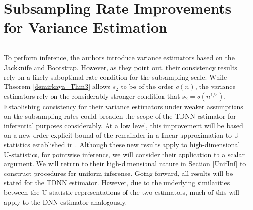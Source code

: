 \documentclass[letterpaper,10pt]{article}
\numberwithin{equation}{section}
\numberwithin{thm}{section}
\newcommand{\1}{\mathbb{1}}
\begin{document}
\section{Subsampling Rate Improvements for Variance Estimation}\label{Subsampling_Improvements}
\hrule
To perform inference, the authors introduce variance estimators based on the Jackknife and Bootstrap.
However, as they point out, their consistency results rely on a likely suboptimal rate condition for the subsampling scale.
While Theorem \ref{demirkaya_Thm3} allows $s_2$ to be of the order $o(n)$, the variance estimators rely on the considerably stronger condition that $s_2 = o(n^{1/3})$.
Establishing consistency for their variance estimators under weaker assumptions on the subsampling rates could broaden the scope of the TDNN estimator for inferential purposes considerably.
At a low level, this improvement will be based on a new order-explicit bound of the remainder in a linear approximation to U-statistics established in \citet{ritzwoller_uniform_2024}.
Although these new results apply to high-dimensional U-statistics, for pointwise inference, we will consider their application to a scalar argument.
We will return to their high-dimensional nature in Section \ref{UnifInf} to construct procedures for uniform inference.
Going forward, all results will be stated for the TDNN estimator.
However, due to the underlying similarities between the U-statistic representations of the two estimators, much of this will apply to the DNN estimator analogously.
\end{document}
